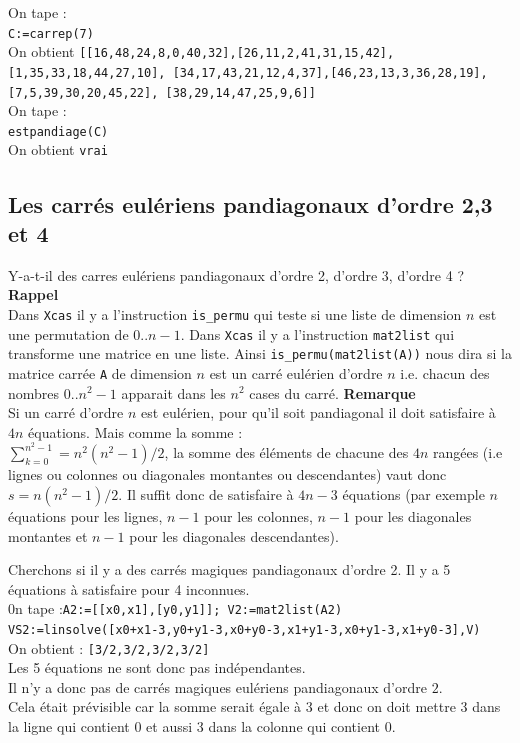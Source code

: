 \documentclass[a4paper,11pt]{book}
\begin{document}
On tape :\\
{\tt C:=carrep(7)}\\
On obtient 
{\tt [[16,48,24,8,0,40,32],[26,11,2,41,31,15,42],[1,35,33,18,44,27,10],
[34,17,43,21,12,4,37],[46,23,13,3,36,28,19],[7,5,39,30,20,45,22],
[38,29,14,47,25,9,6]]}\\
On tape :\\
{\tt estpandiage(C)}\\
On obtient 
{\tt vrai}
\subsection{Les carr\'es eul\'eriens pandiagonaux d'ordre 2,3 et 4}
Y-a-t-il des carres eul\'eriens pandiagonaux d'ordre 2, d'ordre 3, d'ordre 4 ?\\
{\bf Rappel} \\
Dans {\tt Xcas} il y a l'instruction {\tt is\_permu} 
qui teste si une liste de dimension $n$ est une permutation de $0..n-1$.
Dans {\tt Xcas} il y a l'instruction {\tt mat2list} qui transforme une matrice 
en une liste. Ainsi {\tt is\_permu(mat2list(A))} nous dira si la matrice 
carr\'ee {\tt A} de dimension $n$ est un carr\'e eul\'erien d'ordre $n$ i.e. 
chacun des nombres $0..n^2-1$ apparait dans les $n^2$ cases du carr\'e. 
{\bf Remarque} \\
Si un carr\'e d'ordre $n$ est eul\'erien, pour qu'il soit pandiagonal il doit
 satisfaire \`a $4n$ \'equations. Mais comme la somme :\\
$\sum_{k=0}^{n^2-1}=n^2(n^2-1)/2$,
la somme des \'el\'ements de chacune des $4n$ rang\'ees (i.e lignes ou colonnes
ou diagonales montantes ou descendantes) vaut donc $s=n(n^2-1)/2$. Il suffit 
donc de satisfaire \`a $4n-3$ \'equations (par exemple $n$ \'equations pour les 
lignes, $n-1$ pour les  colonnes, $n-1$ pour les diagonales montantes et $n-1$
pour les diagonales  descendantes).

Cherchons si il y a des carr\'es magiques pandiagonaux d'ordre 2.
Il y a 5 \'equations \`a satisfaire pour 4 inconnues.\\
0n tape :{\tt A2:=[[x0,x1],[y0,y1]]; V2:=mat2list(A2)}\\
{\tt VS2:=linsolve([x0+x1-3,y0+y1-3,x0+y0-3,x1+y1-3,x0+y1-3,x1+y0-3],V)}\\
On obtient : {\tt [3/2,3/2,3/2,3/2]}\\
Les 5 \'equations ne sont donc pas ind\'ependantes.\\ 
Il n'y a donc pas de carr\'es magiques eul\'eriens pandiagonaux d'ordre $2$.\\
Cela \'etait pr\'evisible car la somme serait \'egale \`a 3 et donc on doit
mettre 3 dans la ligne qui contient 0 et aussi 3 dans la colonne qui 
contient 0.
\end{document}
